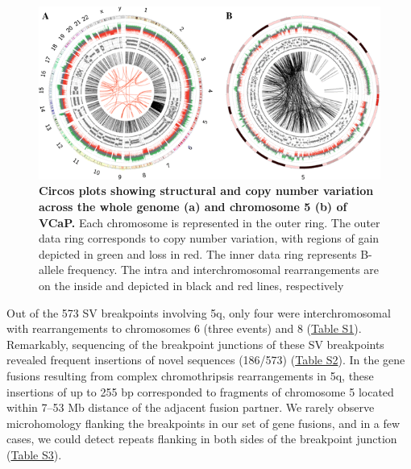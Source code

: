 \begin{figure}
    \includegraphics[width=\textwidth]{chapters/images/vcap/circosplots.png}
    \caption{\textbf{Circos plots showing structural and copy number variation across the whole genome (a) and chromosome 5 (b) of VCaP.} Each chromosome is represented
in the outer ring. The outer data ring corresponds to copy number variation, with regions of gain depicted in green and loss in red. The inner data ring
represents B-allele frequency. The intra and interchromosomal rearrangements are on the inside and depicted in black and red lines, respectively}
    \label{fig:vcap-circos}
\end{figure}


Out of the 573 SV breakpoints involving 5q, only four were interchromosomal with rearrangements to chromosomes 6 (three events) and 8 (\href{https://link.springer.com/article/10.1007/s00439-013-1308-1#SupplementaryMaterial}{Table S1}). Remarkably,
sequencing of the breakpoint junctions of these SV breakpoints revealed frequent insertions of novel sequences (186/573) (\href{https://link.springer.com/article/10.1007/s00439-013-1308-1#SupplementaryMaterial}{Table S2}). In the gene fusions
resulting from complex chromothripsis rearrangements in 5q, these insertions of up to 255 bp corresponded to fragments of chromosome 5 located within 7–53
Mb distance of the adjacent fusion partner. We rarely observe microhomology flanking the breakpoints in our set of gene fusions, and in a few cases,
we could detect repeats flanking in both sides of the breakpoint junction (\href{https://link.springer.com/article/10.1007/s00439-013-1308-1#SupplementaryMaterial}{Table S3}).



